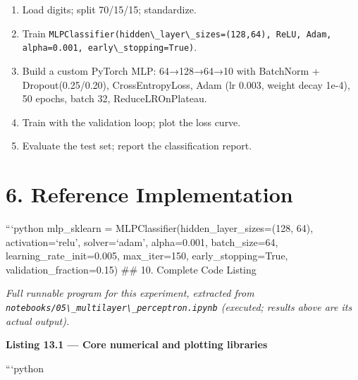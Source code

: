 \begin{enumerate}
\def\labelenumi{\arabic{enumi}.}
\tightlist
\item
  Load digits; split 70/15/15; standardize.
\item
  Train
  \passthrough{\lstinline!MLPClassifier(hidden\_layer\_sizes=(128,64), ReLU, Adam, alpha=0.001, early\_stopping=True)!}.
\item
  Build a custom PyTorch MLP: 64→128→64→10 with BatchNorm +
  Dropout(0.25/0.20), CrossEntropyLoss, Adam (lr 0.003, weight decay
  1e-4), 50 epochs, batch 32, ReduceLROnPlateau.
\item
  Train with the validation loop; plot the loss curve.
\item
  Evaluate the test set; report the classification report.
\end{enumerate}

\section{6. Reference Implementation}\label{reference-implementation}

```python mlp\_sklearn = MLPClassifier(hidden\_layer\_sizes=(128, 64),
activation=`relu', solver=`adam', alpha=0.001, batch\_size=64,
learning\_rate\_init=0.005, max\_iter=150, early\_stopping=True,
validation\_fraction=0.15) \#\# 10. Complete Code Listing

\emph{Full runnable program for this experiment, extracted from
\passthrough{\lstinline!notebooks/05\_multilayer\_perceptron.ipynb!}
(executed; results above are its actual output).}

\textbf{Listing 13.1 --- Core numerical and plotting libraries}

```python
